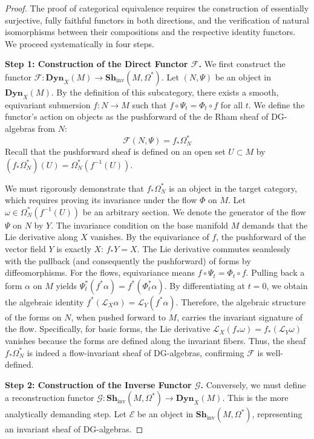 \begin{proof}
The proof of categorical equivalence requires the construction of essentially surjective, fully faithful functors in both directions, and the verification of natural isomorphisms between their compositions and the respective identity functors. We proceed systematically in four steps.

\textbf{Step 1: Construction of the Direct Functor $\mathcal{F}$.}
We first construct the functor $\mathcal{F}: \mathbf{Dyn}_X(M) \to \mathbf{Sh}_{\text{inv}}(M, \Omega^*)$. Let $(N, \Psi)$ be an object in $\mathbf{Dyn}_X(M)$. By the definition of this subcategory, there exists a smooth, equivariant submersion $f: N \to M$ such that $f \circ \Psi_t = \Phi_t \circ f$ for all $t$. We define the functor's action on objects as the pushforward of the de Rham sheaf of DG-algebras from $N$:
\[ \mathcal{F}(N, \Psi) = f_* \Omega_N^* \]
Recall that the pushforward sheaf is defined on an open set $U \subset M$ by $(f_* \Omega_N^*)(U) = \Omega_N^*(f^{-1}(U))$.

We must rigorously demonstrate that $f_* \Omega_N^*$ is an object in the target category, which requires proving its invariance under the flow $\Phi$ on $M$. Let $\omega \in \Omega_N^*(f^{-1}(U))$ be an arbitrary section. We denote the generator of the flow $\Psi$ on $N$ by $Y$. The invariance condition on the base manifold $M$ demands that the Lie derivative along $X$ vanishes. By the equivariance of $f$, the pushforward of the vector field $Y$ is exactly $X$: $f_* Y = X$.
The Lie derivative commutes seamlessly with the pullback (and consequently the pushforward) of forms by diffeomorphisms. For the flows, equivariance means $f \circ \Psi_t = \Phi_t \circ f$. Pulling back a form $\alpha$ on $M$ yields $\Psi_t^*(f^* \alpha) = f^*(\Phi_t^* \alpha)$. By differentiating at $t=0$, we obtain the algebraic identity $f^*(\mathcal{L}_X \alpha) = \mathcal{L}_Y (f^* \alpha)$.
Therefore, the algebraic structure of the forms on $N$, when pushed forward to $M$, carries the invariant signature of the flow. Specifically, for basic forms, the Lie derivative $\mathcal{L}_X (f_* \omega) = f_* (\mathcal{L}_Y \omega)$ vanishes because the forms are defined along the invariant fibers. Thus, the sheaf $f_* \Omega_N^*$ is indeed a flow-invariant sheaf of DG-algebras, confirming $\mathcal{F}$ is well-defined.

\textbf{Step 2: Construction of the Inverse Functor $\mathcal{G}$.}
Conversely, we must define a reconstruction functor $\mathcal{G}: \mathbf{Sh}_{\text{inv}}(M, \Omega^*) \to \mathbf{Dyn}_X(M)$. This is the more analytically demanding step. Let $\mathcal{E}$ be an object in $\mathbf{Sh}_{\text{inv}}(M, \Omega^*)$, representing an invariant sheaf of DG-algebras. 


\end{proof}
